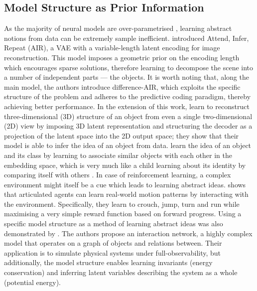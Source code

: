     \subsection{Model Structure as Prior Information}
        As the majority of neural models are over-parametrised \citep{Denil2013}, learning abstract notions from data can be extremely sample inefficient. \cite{Eslami2016} introduced Attend, Infer, Repeat (AIR), a VAE with a variable-length latent encoding for image reconstruction. This model imposes a geometric prior on the encoding length which encourages sparse solutions, therefore learning to decompose the scene into a number of independent parts --- the objects. It is worth noting that, along the main model, the authors introduce difference-AIR, which exploits the specific structure of the problem and adheres to the predictive coding paradigm, thereby achieving better performance. In the extension of this work, \cite{Rezende2016} learn to reconstruct three-dimensional (3D) structure of an object from even a single two-dimensional (2D) view by imposing 3D latent representation and structuring the decoder as a projection of the latent space into the 2D output space; they show that their model is able to infer the idea of an object from data.
        \cite{Haeusser2017} learn the idea of an object and its class by learning to associate similar objects with each other in the embedding space, which is very much like a child learning about its identity by comparing itself with others \citep{Decety2003}.
        In case of reinforcement learning, a complex environment might itself be a cue which leads to learning abstract ideas. \cite{Heess2017} shows that articulated agents can learn real-world motion patterns by interacting with the environment. Specifically, they learn to crouch, jump, turn and run while maximising a very simple reward function based on forward progress.
        Using a specific model structure as a method of learning abstract ideas was also demonstrated by \cite{Battaglia2016}. The authors propose an interaction network, a highly complex model that operates on a graph of objects and relations between. Their application is to simulate physical systems under full-observability, but additionally, the model structure enables learning invariants (\eg energy conservation) and inferring latent variables describing the system as a whole (\eg potential energy).
        
